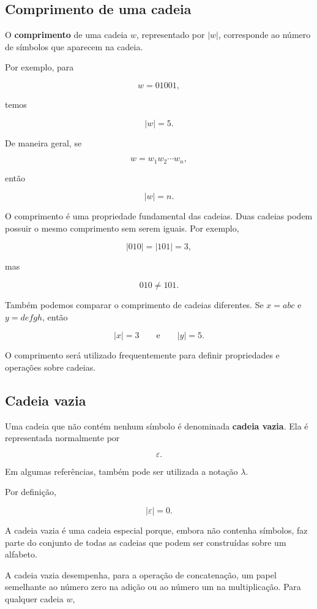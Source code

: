 \documentclass[
  brazilian,
  letterpaper,
]{book}
\theoremstyle{plain}
\theoremstyle{definition}
\theoremstyle{remark}
\begin{document}
\subsection{Comprimento de uma cadeia}\label{comprimento-de-uma-cadeia}

O \textbf{comprimento} de uma cadeia \(w\), representado por \(|w|\),
corresponde ao número de símbolos que aparecem na cadeia.

Por exemplo, para

\[
w=01001,
\]

temos

\[
|w|=5.
\]

De maneira geral, se

\[
w=w_1w_2\cdots w_n,
\]

então

\[
|w|=n.
\]

O comprimento é uma propriedade fundamental das cadeias. Duas cadeias
podem possuir o mesmo comprimento sem serem iguais. Por exemplo,

\[
|010|=|101|=3,
\]

mas

\[
010\neq101.
\]

Também podemos comparar o comprimento de cadeias diferentes. Se
\(x=abc\) e \(y=defgh\), então

\[
|x|=3
\qquad\text{e}\qquad
|y|=5.
\]

O comprimento será utilizado frequentemente para definir propriedades e
operações sobre cadeias.

\subsection{Cadeia vazia}\label{cadeia-vazia}

Uma cadeia que não contém nenhum símbolo é denominada \textbf{cadeia
vazia}. Ela é representada normalmente por

\[
\varepsilon.
\]

Em algumas referências, também pode ser utilizada a notação \(\lambda\).

Por definição,

\[
|\varepsilon|=0.
\]

A cadeia vazia é uma cadeia especial porque, embora não contenha
símbolos, faz parte do conjunto de todas as cadeias que podem ser
construídas sobre um alfabeto.

A cadeia vazia desempenha, para a operação de concatenação, um papel
semelhante ao número zero na adição ou ao número um na multiplicação.
Para qualquer cadeia \(w\),
\end{document}
